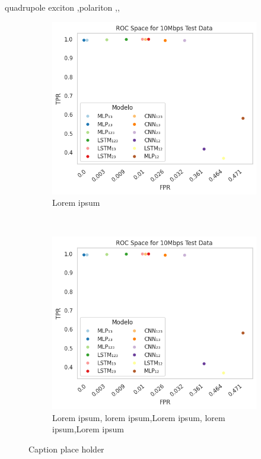 \documentclass[a4paper,fleqn]{cas-sc}
\begin{document}
	\begin{keywords}
		quadrupole exciton \sep polariton \sep \WGM \sep \BEC
	\end{keywords}
	
	
	\maketitle

\centering
\begin{figure}[!htb]
	\begin{minipage}{0.45\textwidth}
	\begin{subfigure}[t]{0.25\textwidth}
		\centering
		\includegraphics[width=1.0\textwidth]{./figs/ROC-Space-Test-Data-10Mbps.png}
		\caption{Lorem ipsum}
	\end{subfigure}%
	~ 
	\begin{subfigure}[t]{0.25\textwidth}
		\centering
		\includegraphics[width=1.0\textwidth]{./figs/ROC-Space-Test-Data-10Mbps.png}
		\caption{Lorem ipsum, lorem ipsum,Lorem ipsum, lorem ipsum,Lorem ipsum}
	\end{subfigure}
	\caption{Caption place holder}
\end{minipage}
\end{figure}
\end{document}
